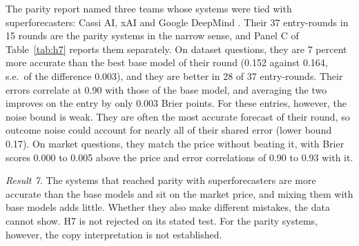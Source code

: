 \documentclass[11pt,a4paper]{article}
\theoremstyle{definition}
\begin{document}
The parity report named three teams whose systems were tied with superforecasters: Cassi AI, xAI and Google DeepMind \citep{fri2026parity}. Their 37 entry-rounds in 15 rounds are the parity systems in the narrow sense, and Panel C of Table~\ref{tab:h7} reports them separately. On dataset questions, they are 7 percent more accurate than the best base model of their round (0.152 against 0.164, s.e.\ of the difference 0.003), and they are better in 28 of 37 entry-rounds. Their errors correlate at 0.90 with those of the base model, and averaging the two improves on the entry by only 0.003 Brier points. For these entries, however, the noise bound is weak. They are often the most accurate forecast of their round, so outcome noise could account for nearly all of their shared error (lower bound 0.17). On market questions, they match the price without beating it, with Brier scores 0.000 to 0.005 above the price and error correlations of 0.90 to 0.93 with it.

\emph{Result 7.} The systems that reached parity with superforecasters are more accurate than the base models and sit on the market price, and mixing them with base models adds little. Whether they also make different mistakes, the data cannot show. H7 is not rejected on its stated test. For the parity systems, however, the copy interpretation is not established.
\end{document}
